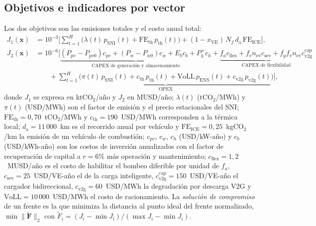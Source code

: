 \documentclass[11pt,a4paper]{article}
\newcommand{\vect}[1]{\bm{#1}}
\newcommand{\CO}{CO$_2$}
\begin{document}
\subsection{Objetivos e indicadores por vector}
Los dos objetivos son las emisiones totales y el costo anual total:
\begin{align}
J_1(\vect{x}) &= 10^{-3}\Big[\sum_{t=1}^{H}\big(\lambda(t)\,p_{\mathrm{SNI}}(t) + \mathrm{FE}_{\mathrm{th}}\,p_{\mathrm{th}}(t)\big)
 + (1-x_{\mathrm{VE}})\,N_f\,d_{\mathrm{a}}\,\mathrm{FE}_{\mathrm{ICE}}\Big],
\label{eq:J1}\\
J_2(\vect{x}) &= 10^{-6}\Big[\underbrace{(P_{pv}-P_{pv0})c_{pv} + (P_w-P_{w0})c_w + E_b c_b + P_h^{+}c_h}_{\text{CAPEX de generaci\'on y almacenamiento}}
 + \underbrace{f_a c_{\mathrm{flex}} + f_v n_{\mathrm{ev}} c_{\mathrm{sev}} + f_g f_v n_{\mathrm{ev}} c^{\mathrm{cap}}_{\mathrm{v2g}}}_{\text{CAPEX de flexibilidad}}
\nonumber\\
 &\qquad + \underbrace{\sum_{t=1}^{H}\big(\pi(t)\,p_{\mathrm{SNI}}(t) + c_{\mathrm{th}}\,p_{\mathrm{th}}(t) + \mathrm{VoLL}\,p_{\mathrm{ENS}}(t) + c_{\mathrm{v2g}}\,p_{\mathrm{v2g}}(t)\big)}_{\text{OPEX}}\Big],
\label{eq:J2}
\end{align}
donde $J_1$ se expresa en kt\CO/a\~no y $J_2$ en MUSD/a\~no; $\lambda(t)$ (t\CO/MWh) y
$\pi(t)$ (USD/MWh) son el factor de emisi\'on y el precio estacionales del SNI;
$\mathrm{FE}_{\mathrm{th}}=0{,}70$~t\CO/MWh y $c_{\mathrm{th}}=190$~USD/MWh corresponden a la
t\'ermica local; $d_{\mathrm{a}}=11\,000$~km es el recorrido anual por veh\'iculo y
$\mathrm{FE}_{\mathrm{ICE}}=0{,}25$~kg\CO/km la emisi\'on de un veh\'iculo de combusti\'on;
$c_{pv}$, $c_w$, $c_h$ (USD/kW-a\~no) y $c_b$ (USD/kWh-a\~no) son los costos de inversi\'on
anualizados con el factor de recuperaci\'on de capital a $r=6\%$ m\'as operaci\'on y
mantenimiento; $c_{\mathrm{flex}}=1{,}2$~MUSD/a\~no es el costo de habilitar el bombeo
diferible por unidad de $f_a$, $c_{\mathrm{sev}}=25$~USD/VE-a\~no el de la carga
inteligente, $c^{\mathrm{cap}}_{\mathrm{v2g}}=150$~USD/VE-a\~no el cargador bidireccional,
$c_{\mathrm{v2g}}=60$~USD/MWh la degradaci\'on por descarga V2G y
$\mathrm{VoLL}=10\,000$~USD/MWh el costo de racionamiento. La \emph{soluci\'on de
compromiso} de un frente es la que minimiza la distancia al punto ideal del frente
normalizado, $\min\|\tilde{\vect{F}}\|_2$ con
$\tilde F_i=(J_i-\min J_i)/(\max J_i-\min J_i)$.
\end{document}
